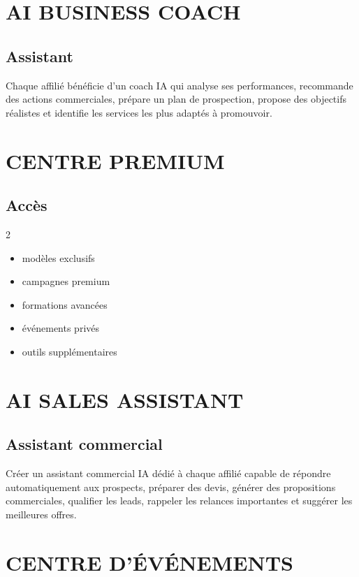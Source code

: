 \documentclass[12pt,a4paper,oneside]{book}
\begin{document}
\chapter{AI BUSINESS COACH}

\section{Assistant}
Chaque affilié bénéficie d'un coach IA qui analyse ses performances, recommande des actions commerciales, prépare un plan de prospection, propose des objectifs réalistes et identifie les services les plus adaptés à promouvoir.

\chapter{CENTRE PREMIUM}

\section{Accès}
\begin{multicols}{2}
\begin{itemize}
\item modèles exclusifs
\item campagnes premium
\item formations avancées
\item événements privés
\item outils supplémentaires
\end{itemize}
\end{multicols}

\chapter{AI SALES ASSISTANT}

\section{Assistant commercial}
Créer un assistant commercial IA dédié à chaque affilié capable de répondre automatiquement aux prospects, préparer des devis, générer des propositions commerciales, qualifier les leads, rappeler les relances importantes et suggérer les meilleures offres.

\chapter{CENTRE D'ÉVÉNEMENTS}
\end{document}
